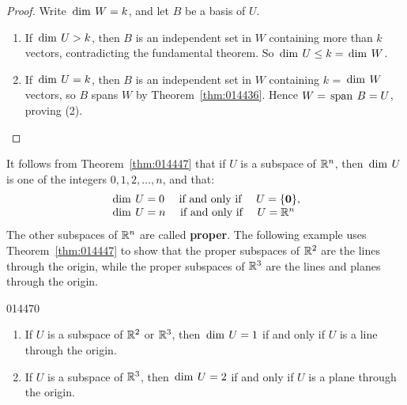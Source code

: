 \newpage
\begin{proof}
Write $\thinspace\operatorname{dim\medspace} W = k$, and let $B$ be a basis of $U$.

\begin{enumerate}
\item If $\thinspace\operatorname{dim\medspace} U > k$, then $B$ is an independent set in $W$ containing more than $k$ vectors, contradicting the fundamental theorem. So $\thinspace\operatorname{dim\medspace} U \leq k = \thinspace\operatorname{dim\medspace} W$.

\item If $\thinspace\operatorname{dim\medspace} U = k$, then $B$ is an independent set in $W$ containing $k$ = $\thinspace\operatorname{dim\medspace} W$ vectors, so $B$ spans $W$ by Theorem~\ref{thm:014436}. Hence $W = \thinspace\operatorname{span\medspace} B = U$, proving (2).
\end{enumerate}
\vspace*{-2em}\end{proof}

\noindent It follows from Theorem~\ref{thm:014447} that if $U$ is a subspace of $\mathbb{R}^n$, then $\thinspace\operatorname{dim\medspace} U$ is one of the integers $0, 1, 2, \dots, n$, and that:
\begin{equation*}
\begin{array}{l}
	\thinspace\operatorname{dim \medspace} U = 0 \quad \mbox{ if and only if } \quad U = \{\textbf{0}\}, \\
	\thinspace\operatorname{dim \medspace} U = n \quad \mbox{ if and only if } \quad U = \mathbb{R}^n
\end{array}
\end{equation*}
The other subspaces of $\mathbb{R}^n$ are called \textbf{proper}. The following example uses Theorem~\ref{thm:014447} to show that the proper subspaces of $\mathbb{R}^2$ are the lines through the origin, while the proper subspaces of $\mathbb{R}^3$ are the lines and planes through the origin.

\begin{example}{}{014470}
\begin{enumerate}
\item If $U$ is a subspace of $\mathbb{R}^2$ or $\mathbb{R}^3$, then $\thinspace\operatorname{dim\medspace} U = 1$ if and only if $U$ is a line through the origin.

\item If $U$ is a subspace of $\mathbb{R}^3$, then $\thinspace\operatorname{dim\medspace} U = 2$ if and only if $U$ is a plane through the origin.

\end{enumerate}
\end{example}

